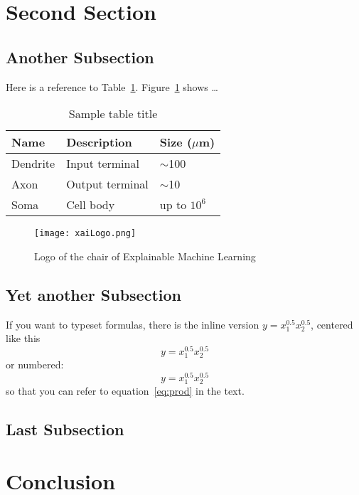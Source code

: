 \documentclass{xai-thesis}
\begin{document}
\section{Second Section}
\label{sec:second}

\subsection{Another Subsection}
\label{subsec:another}
Here is a reference to Table~\ref{t1:sample}. Figure~\ref{fig:xai_logo} shows \ldots


\begin{table}[ht]
	\caption{Sample table title}
	\centering
	\begin{tabular}{lll}
		\hline
		Name     & Description     & Size ($\mu$m) \\
		\hline
		Dendrite & Input terminal  & $\sim$100     \\
		Axon     & Output terminal & $\sim$10      \\
		Soma     & Cell body       & up to $10^6$  \\
		\hline
	\end{tabular}
   \label{t1:sample}
\end{table}


\begin{figure}[ht]
  \centering
   \texttt{[image: xaiLogo.png]}
  \caption{Logo of the chair of Explainable Machine Learning}   
  \label{fig:xai_logo}
\end{figure}  

\subsection{Yet another Subsection}
\label{subsec:yetanother}

If you want to typeset formulas, there is the inline version $ y = x_1^{0.5} x_2^{0.5}$, centered like this
\[
y = x_1^{0.5} x_2^{0.5}
\]
or numbered:
\begin{equation}\label{eq:prod}
y = x_1^{0.5} x_2^{0.5}	
\end{equation}
so that you can refer to equation~\ref{eq:prod} in the text.

\subsection{Last Subsection}
\label{subsec:last}

\section{Conclusion}
\end{document}
